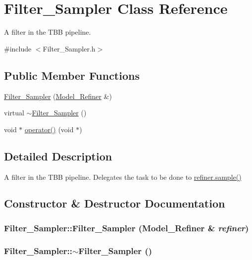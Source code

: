 \hypertarget{class_filter___sampler}{
\section{Filter\_\-Sampler Class Reference}
\label{class_filter___sampler}
}


A filter in the TBB pipeline.  




{\ttfamily \#include $<$Filter\_\-Sampler.h$>$}

\subsection*{Public Member Functions}
\begin{DoxyCompactItemize}
\item 
\hyperlink{class_filter___sampler_aa1da6bf225957fefb4f9453cfb6ec24f}{Filter\_\-Sampler} (\hyperlink{class_model___refiner}{Model\_\-Refiner} \&)
\item 
virtual \hyperlink{class_filter___sampler_ac4b1b900c67c1860ca74c6740d531a19}{$\sim$Filter\_\-Sampler} ()
\item 
void $\ast$ \hyperlink{class_filter___sampler_a7fab77093976d4dfcc6564dcf09c96a6}{operator()} (void $\ast$)
\end{DoxyCompactItemize}


\subsection{Detailed Description}
A filter in the TBB pipeline. Delegates the task to be done to \hyperlink{namespacesampler_a5e94e46fa64275d6575d568932f827be}{refiner.sample()} 

\subsection{Constructor \& Destructor Documentation}
\hypertarget{class_filter___sampler_aa1da6bf225957fefb4f9453cfb6ec24f}{
\subsubsection[{Filter\_\-Sampler}]{\setlength{\rightskip}{0pt plus 5cm}Filter\_\-Sampler::Filter\_\-Sampler ({\bf Model\_\-Refiner} \& {\em refiner})}}
\label{class_filter___sampler_aa1da6bf225957fefb4f9453cfb6ec24f}
\hypertarget{class_filter___sampler_ac4b1b900c67c1860ca74c6740d531a19}{
\subsubsection[{$\sim$Filter\_\-Sampler}]{\setlength{\rightskip}{0pt plus 5cm}Filter\_\-Sampler::$\sim$Filter\_\-Sampler ()}}
\label{class_filter___sampler_ac4b1b900c67c1860ca74c6740d531a19}


